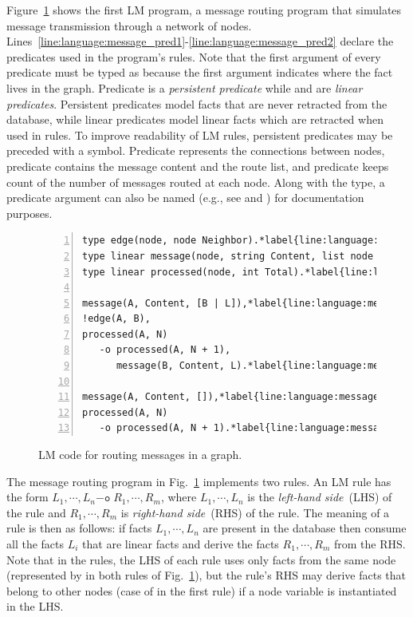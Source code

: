 
Figure~\ref{code:language:message} shows the first LM program, a message routing
program that simulates message transmission through a network of nodes.
Lines~\ref{line:language:message_pred1}-\ref{line:language:message_pred2}
declare the predicates used in the program's rules. Note that the first argument
of every predicate must be typed as  because the first argument
indicates where the fact lives in the graph. Predicate  is a
\emph{persistent predicate} while  and  are
\emph{linear predicates}. Persistent predicates model facts that are never
retracted from the database, while linear predicates model linear facts which
are retracted when used in rules. To improve readability of LM rules, persistent
predicates may be preceded with a \code{!} symbol. Predicate 
represents the connections between nodes, predicate  contains the
message content and the route list, and predicate  keeps count
of the number of messages routed at each node. Along with the type, a predicate
argument can also be named (e.g., see  and ) for
documentation purposes.

\begin{figure}[h!]
\begin{Verbatim}[numbers=left,commandchars=\*\{\},fontsize=\codesize]
type edge(node, node Neighbor).*label{line:language:message_pred1}*hfill// Predicate declaration
type linear message(node, string Content, list node Routing).
type linear processed(node, int Total).*label{line:language:message_pred2}

message(A, Content, [B | L]),*label{line:language:message_first1}*hfill// Rule 1
!edge(A, B),
processed(A, N)
   -o processed(A, N + 1),
      message(B, Content, L).*label{line:language:message_first2}

message(A, Content, []),*label{line:language:message_second1}*hfill// Rule 2
processed(A, N)
   -o processed(A, N + 1).*label{line:language:message_second2}
\end{Verbatim}
\caption{LM code for routing messages in a graph.}
\label{code:language:message}
\end{figure}

The message routing program in Fig.~\ref{code:language:message} implements two
rules. An LM rule has the form $L_1, \cdots, L_n \mathtt{-o} \; R_1, \cdots,
R_m$, where $L_1, \cdots, L_n$ is the \emph{left-hand side}~(LHS) of the rule
and $R_1, \cdots, R_m$ is \emph{right-hand side}~(RHS) of the rule. The meaning
of a rule is then as follows: if facts $L_1, \cdots, L_n$ are present in the
database then consume all the facts $L_i$ that are linear facts and derive the
facts $R_1, \cdots, R_m$ from the RHS. Note that in the rules, the LHS of each
rule uses only facts from the same node (represented by  in both rules
of Fig.~\ref{code:language:message}), but the rule's RHS may derive facts that
belong to other nodes (case of  in the first rule) if a node variable is
instantiated in the LHS.

